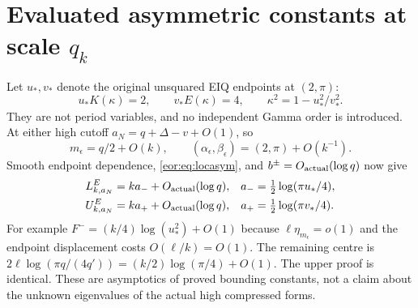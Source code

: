 \documentclass[11pt,a4paper]{article}
\begin{document}
\section{Evaluated asymmetric constants at scale $q_k$}
Let $u_*,v_*$ denote the original unsquared EIQ endpoints at $(2,\pi)$:
\begin{equation}
 u_*K(\kappa)=2,\qquad v_*E(\kappa)=4,\qquad
 \kappa^2=1-u_*^2/v_*^2.
 \label{eor:eq:limitendpoints}
\end{equation}
They are not period variables, and no independent Gamma order is introduced.
At either high cutoff $a_N=q+\Delta-v+O(1)$, so
\[
 m_\epsilon=q/2+O(k),\qquad
 (\alpha_\epsilon,\beta_\epsilon)=(2,\pi)+O(k^{-1}).
\]
Smooth endpoint dependence, \eqref{eor:eq:locasym}, and
$b^\pm=O_{\rm actual}(\log q)$ now give
\begin{equation}
\begin{aligned}
 L_{k,a_N}^{E}&=k a_-+O_{\rm actual}(\log q),
      &a_-&=\tfrac12\log(\pi u_*/4),\\
 U_{k,a_N}^{E}&=k a_++O_{\rm actual}(\log q),
      &a_+&=\tfrac12\log(\pi v_*/4).
\end{aligned}\label{eor:eq:highasym}
\end{equation}
For example $F^-=(k/4)\log(u_*^2)+O(1)$ because
$\ell\eta_{m_\epsilon}=o(1)$ and the endpoint displacement costs
$O(\ell/k)=O(1)$. The remaining centre is
$2\ell\log(\pi q/(4q'))=(k/2)\log(\pi/4)+O(1)$.
The upper proof is identical. These are asymptotics of proved bounding constants,
not a claim about the unknown eigenvalues of the actual high compressed forms.
\end{document}
